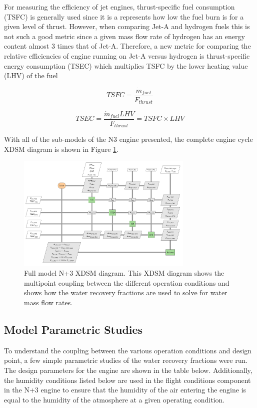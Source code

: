 \documentclass[conf]{new-aiaa}
\begin{document}
For measuring the efficiency of jet engines, thrust-specific fuel consumption (TSFC) is generally used since it is a represents how low the fuel burn is for a given level of thrust.
However, when comparing Jet-A and hydrogen fuels this is not such a good metric since a given mass flow rate of hydrogen has an energy content almost 3 times that of Jet-A.
Therefore, a new metric for comparing the relative efficiencies of engine running on Jet-A versus hydrogen is thrust-specific energy consumption (TSEC) which multiplies TSFC by the lower heating value (LHV) of the fuel %

\begin{equation}
    TSFC = \frac{\Dot{m}_{fuel}}{F_{thrust}}
\end{equation}

\begin{equation}
    TSEC = \frac{\Dot{m}_{fuel} LHV}{F_{thrust}} = TSFC \times LHV
\end{equation}

With all of the sub-models of the N3 engine presented, the complete engine cycle XDSM diagram is shown in Figure \ref{fig:N3_xdsm_full}.

\begin{figure}[hbt!]
    \centering
    \includegraphics[width=0.75\textwidth]{N3_xdsm_full.pdf}
    \caption{
        Full model N+3 XDSM diagram.
        This XDSM diagram shows the multipoint coupling between the different operation conditions and shows how the water recovery fractions are used to solve for water mass flow rates.
    }
    \label{fig:N3_xdsm_full}
\end{figure}

\subsection{Model Parametric Studies}
To understand the coupling between the various operation conditions and design point, a few simple parametric studies of the water recovery fractions were run.
The design parameters for the engine are shown in the table below.
Additionally, the humidity conditions listed below are used in the flight conditions component in the N+3 engine to ensure that the humidity of the air entering the engine is equal to the humidity of the atmosphere at a given operating condition.
\end{document}
